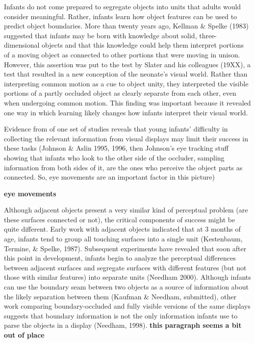 Infants do not come prepared to segregate objects into units that
adults would consider meaningful.  Rather, infants learn how object
features can be used to predict object boundaries.  More than twenty
years ago, Kellman \& Spelke (1983) suggested that infants may be born
with knowledge about solid, three-dimensional objects and that this
knowledge could help them interpret portions of a moving object as
connected to other portions that were moving in unison.  However, this
assertion was put to the test by Slater and his colleagues (19XX), a
test that resulted in a new conception of the neonate's visual
world.  Rather than interpreting common motion as a cue to object
unity, they interpreted the visible portions of a partly occluded
object as clearly separate from each other, even when undergoing
common motion.  This finding was important because it revealed one way
in which learning likely changes how infants interpret their visual
world.

Evidence from of one set of studies reveals that young
infants' difficulty in collecting the relevant information
from visual displays may limit their success in these tasks (Johnson \&
Aslin 1995, 1996, then Johnson's eye tracking stuff showing
that infants who look to the other side of the occluder, sampling
information from both sides of it, are the ones who perceive the
object parts as connected.  So, eye movements are an important factor
in this picture)

{\bf eye movements}

Although adjacent objects present a very similar kind of perceptual
problem (are these surfaces connected or not), the critical components
of success might be quite different.  Early work with adjacent objects
indicated that at 3 months of age, infants tend to group all touching
surfaces into a single unit (Kestenbaum, Termine, \& Spelke, 1987).
Subsequent experiments have revealed that soon after this point in
development, infants begin to analyze the perceptual differences
between adjacent surfaces and segregate surfaces with different
features (but not those with similar features) into separate units
(Needham 2000).  Although infants can use the boundary seam between
two objects as a source of information about the likely separation
between them (Kaufman \& Needham, submitted), other work comparing
boundary-occluded and fully visible versions of the same displays
suggests that boundary information is not the only information infants
use to parse the objects in a display (Needham, 1998).  
{\bf this paragraph seems a bit out of place}

